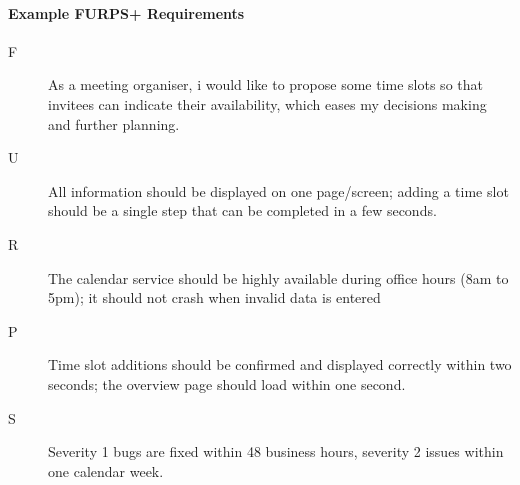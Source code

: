 \paragraph{Example FURPS+ Requirements}
\begin{description}
	\item [F] As a meeting organiser, i would like to propose some time slots so that invitees can indicate their availability, which eases my decisions making and further planning.
	\item [U] All information should be displayed on one page/screen; adding a time slot should be a single step that can be completed in a few seconds.
	\item [R] The calendar service should be highly available during office hours (8am to 5pm); it should not crash when invalid data is entered
	\item [P] Time slot additions should be confirmed and displayed correctly within two seconds; the overview page should load within one second.
	\item [S] Severity 1 bugs are fixed within 48 business hours, severity 2 issues within one calendar week.
\end{description}
